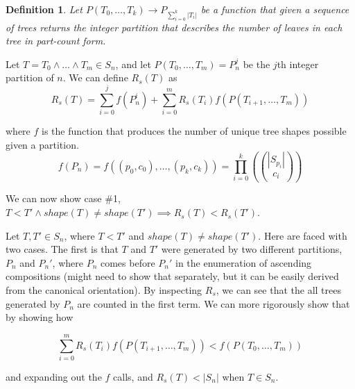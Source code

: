 \documentclass{article}
\newcommand{\wlw}{\wedge{} \ldots{} \wedge{}}
\newcommand{\nleaves}[1]{|#1|}
\newcommand{\shape}[1]{shape(#1)}
\newcommand{\multichoose}[2]{\left(\!\!{#1 \choose{} #2}\!\!\right)}
\newtheorem{definition}{Definition}
\begin{document}
\begin{definition}
    Let $P(T_0, \ldots, T_k) \rightarrow P_{\sum_{i=0}^k \nleaves{T_i}}$
    be a function that given a sequence of trees returns the integer partition that
    describes the number of leaves in each tree in part-count form.
\end{definition}

Let $T = T_0 \wlw T_m \in S_n$, and let $P(T_0, \ldots, T_m) = P_n^j$ be the $j$th integer
partition of $n$.
We can define $R_s(T)$ as
\[
    R_s(T) = \sum_{i=0}^{j} f(P_n^i) + \sum_{i=0}^m R_s(T_i)f(P(T_{i+1}, \ldots, T_m))
\]

where $f$ is the function that produces the number of unique tree shapes possible
given a partition.
\[
    f(P_n)
    = f((p_0, c_0), \ldots, (p_k, c_k))
    = \prod_{i=0}^k \multichoose{|S_{p_i}|}{c_i}
\]

We can now show case \#1,
$T < T' \land \shape{T} \neq \shape{T'} \implies R_s(T) < R_s(T')$.

Let $T, T' \in S_n$, where $T < T'$ and $\shape{T} \neq \shape{T'}$.
Here are faced with two cases.
The first is that $T$ and $T'$ were generated by two different
partitions, $P_n$ and $P_n'$, where $P_n$ comes before $P_n'$
in the enumeration of ascending compositions
(might need to show that separately, but it can be easily derived
from the canonical orientation).
By inspecting $R_s$, we can see that the all trees generated by $P_n$
are counted in the first term. We can more rigorously show that by
showing how

\begin{equation}
    \sum_{i=0}^m R_s(T_i)f(P(T_{i+1}, \ldots, T_m)) < f(P(T_0, \ldots, T_m))
\end{equation}

and expanding out the $f$ calls, and $R_s(T) < |S_n|$ when $T \in S_n$.
\end{document}

